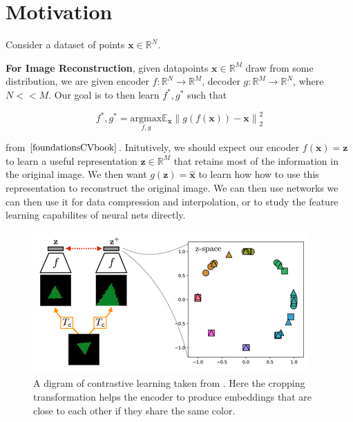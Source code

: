 \documentclass{article}
\newcommand{\norm}[1]{\left\lVert#1\right\rVert}
\begin{document}
\section{Motivation}

Consider a dataset of points $\mathbf{x} \in \mathbb{R}^N$. 

\textbf{For Image Reconstruction}, given datapoints $\mathbf{x} \in \mathbb{R}^M$ draw from some distribution, we are given encoder $f: \mathbb{R}^N \to \mathbb{R}^M$, decoder $g : \mathbb{R}^M \to \mathbb{R}^N$, where $N << M$. Our goal is to then learn $f^*, g^*$ such that 

\[ f^*, g^* = \underset{f, g}{\text{argmax}} \mathbb{E}_{\textbf{x}} \norm{ g(f(\textbf{x})) - \textbf{x}}^2_2 \]

from $\cite{foundationsCVbook}$. Initutively, we should expect our encoder $f(\textbf{x}) = \textbf{z}$ to learn a useful representation $\textbf{z} \in \mathbb{R}^M$ that retains most of the information in the original image. We then want $g(\textbf{z}) = \hat{ \textbf{x} }$ to learn how how to use this representation to reconstruct the original image. We can then use networks we can then use it for data compression and interpolation, or to study the feature learning capabilites of neural nets directly.

\begin{figure}
\includegraphics[scale=0.70]{contrastive_learning.png}
\caption{A digram of contrastive learning taken from \cite{foundationsCVbook}. Here the cropping transformation helps the encoder to produce embeddings that are close to each other if they share the same color.}\label{fig:contrast_learn}
\end{figure}
\end{document}
